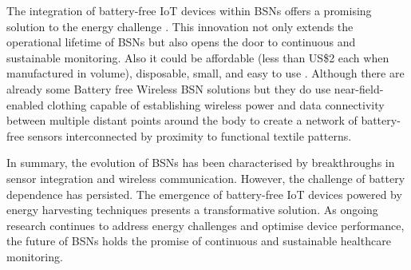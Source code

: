 \noindent The integration of battery-free IoT devices within BSNs offers a promising solution to the energy challenge \cite{5370806}. This innovation not only extends the operational lifetime of BSNs but also opens the door to continuous and sustainable monitoring. Also it could be affordable (less than US\$2 each when manufactured in volume), disposable, small, and easy to use \cite{5370806}. Although there are already some Battery free Wireless BSN solutions but they do use near-field-enabled clothing capable of establishing wireless power and data connectivity between multiple distant points around the body to create a network of battery-free sensors interconnected by proximity to functional textile patterns.\cite{Lin_Kim_Achavananthadith_Kurt_Tan_Yao_Tee_Lee_Ho_2020}
\vspace{1\baselineskip}

\noindent In summary, the evolution of BSNs has been characterised by breakthroughs in sensor integration and wireless communication. However, the challenge of battery dependence has persisted. The emergence of battery-free IoT devices powered by energy harvesting techniques presents a transformative solution. As ongoing research continues to address energy challenges and optimise device performance, the future of BSNs holds the promise of continuous and sustainable healthcare monitoring.